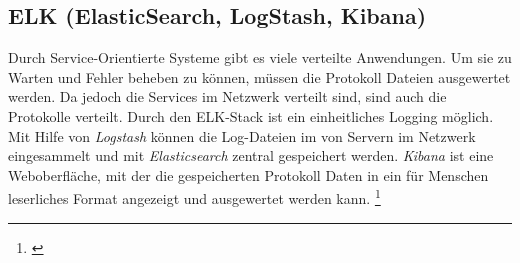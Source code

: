 \subsection{ELK (ElasticSearch, LogStash, Kibana)}
\label{subsec:elk}
Durch Service-Orientierte Systeme gibt es viele verteilte Anwendungen. Um sie zu Warten und Fehler beheben zu können, müssen die Protokoll Dateien ausgewertet werden. Da jedoch die Services im Netzwerk verteilt sind, sind auch die Protokolle verteilt. Durch den ELK-Stack ist ein einheitliches Logging möglich.
Mit Hilfe von \textit{Logstash} können die Log-Dateien im von Servern im Netzwerk eingesammelt und mit \textit{Elasticsearch} zentral gespeichert werden. \textit{Kibana} ist eine Weboberfläche, mit der die gespeicherten Protokoll Daten in ein für Menschen leserliches Format angezeigt und ausgewertet werden kann.
\footnote{\cite[vgl. S. 244 ff.]{EWolff2016:Microservices}}